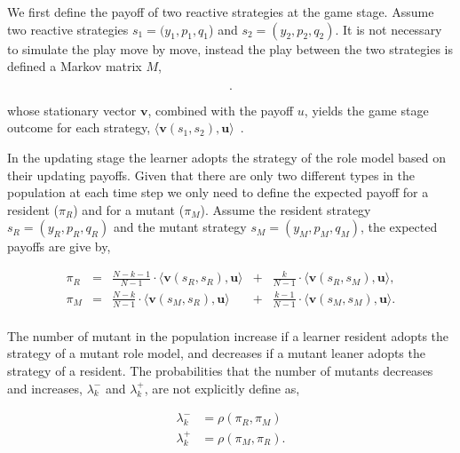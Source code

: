 \documentclass[11pt]{article}
\theoremstyle{plainCl1}
\theoremstyle{plainCl2}
\begin{document}
We first define the payoff of two reactive strategies at the game stage. Assume
two reactive strategies $s_1\!=\!(y_1, p_1, q_1$) and $s_2\!=\!(y_2,p_2,q_2)$.
It is not necessary to simulate the play move by move, instead the play between
the two strategies is defined a Markov matrix \(M\),

\begin{equation}\label{eq:transition_matrix}
  .
\end{equation}

whose stationary vector \(\mathbf{v}\), combined with the payoff \(u\), yields
the game stage outcome for each strategy,
\(\langle\mathbf{v}(s_1,s_2),\mathbf{u}\rangle\)~\cite{Hauert1997}.


In the updating stage the learner adopts the strategy of the role model based on
their updating payoffs. Given that there are only two different types in the
population at each time step we only need to define the expected payoff for a
resident (\(\pi_R\)) and for a mutant (\(\pi_M\)). Assume the resident strategy
\(s_R = (y_R, p_R, q_R)\) and the mutant strategy \(s_M = (y_M, p_M, q_M)\), the
expected payoffs are give by,

\begin{equation} \label{Eq:ExpPay}
  \begin{array}{lcrcr}
  \displaystyle \pi_R	&=	&\displaystyle \frac{N\!-\!k\!-\!1}{N-1}\cdot \langle\mathbf{v}(s_R,s_R),\mathbf{u}\rangle	&+	&\displaystyle\frac{k}{N-1}\cdot \langle\mathbf{v}(s_R,s_M),\mathbf{u}\rangle,\\[0.5cm]
  \displaystyle \pi_M	&=	&\displaystyle\frac{N-k}{N-1}\cdot \langle\mathbf{v}(s_M,s_R),\mathbf{u}\rangle&+	&\displaystyle\frac{k-1}{N-1}\cdot \langle\mathbf{v}(s_M,s_M),\mathbf{u}\rangle.\\
  \end{array}
\end{equation}

The number of mutant in the population increase if a learner resident adopts the
strategy of a mutant role model, and decreases if a mutant leaner adopts the
strategy of a resident. The probabilities that the number of mutants decreases
and increases, \(\lambda^-_k\) and \(\lambda^+_k\), are not explicitly define
as,

\begin{align*} 
  \lambda^-_k &\!=\!\rho(\pi_R, \pi_M) \\
  \lambda^+_k &\!=\!\rho(\pi_M, \pi_R).
\end{align*}
\end{document}
